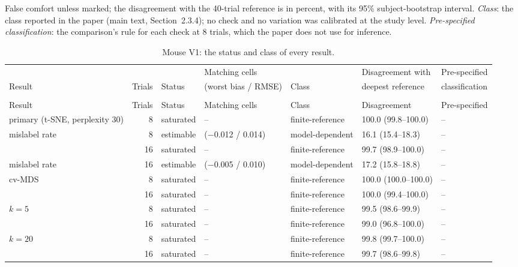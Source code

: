 \documentclass[11pt]{article}
\newcommand{\tablenote}[1]{\par\smallskip\noindent
  \begin{minipage}{\linewidth}\footnotesize\setlength{\parindent}{0pt}#1\end{minipage}}
\renewcommand{\thetable}{S\arabic{table}}
\begin{document}
\tablenote{False comfort unless marked; the disagreement with the 40-trial reference is in percent, with its 95\% subject-bootstrap interval.
\emph{Class}: the class reported in the paper (main text, Section~2.3.4); no check and no variation was calibrated at the study level.
\emph{Pre-specified classification}: the comparison's rule for each check at 8 trials, which the paper does not use for inference.}

{\scriptsize\setlength{\tabcolsep}{4pt}
\begin{longtable}{>{\raggedright\arraybackslash}p{3.0cm}rl>{\raggedright\arraybackslash}p{2.3cm}>{\raggedright\arraybackslash}p{2.1cm}ll}
\caption{Mouse V1: the status and class of every result.}\\
\toprule
 & & & Matching cells & & Disagreement with & Pre-specified \\
Result & Trials & Status & (worst bias / RMSE) & Class & deepest reference & classification \\
\midrule
\endfirsthead
\multicolumn{7}{l}{\textit{Table~\thetable, continued}} \\
\toprule
Result & Trials & Status & Matching cells & Class & Disagreement & Pre-specified \\
\midrule
\endhead
\bottomrule
\endfoot
primary (t-SNE, perplexity 30) & 8 & saturated & -- & finite-reference & 100.0 (99.8--100.0) & -- \\
\quad mislabel rate & 8 & estimable & 10 ($-$0.012 / 0.014) & model-dependent & 16.1 (15.4--18.3) & -- \\
 & 16 & saturated & -- & finite-reference & 99.7 (98.9--100.0) & -- \\
\quad mislabel rate & 16 & estimable & 9 ($-$0.005 / 0.010) & model-dependent & 17.2 (15.8--18.8) & -- \\
\addlinespace
cv-MDS & 8 & saturated & -- & finite-reference & 100.0 (100.0--100.0) & -- \\
 & 16 & saturated & -- & finite-reference & 100.0 (99.4--100.0) & -- \\
\addlinespace
$k=5$ & 8 & saturated & -- & finite-reference & 99.5 (98.6--99.9) & -- \\
 & 16 & saturated & -- & finite-reference & 99.0 (96.8--100.0) & -- \\
\addlinespace
$k=20$ & 8 & saturated & -- & finite-reference & 99.8 (99.7--100.0) & -- \\
 & 16 & saturated & -- & finite-reference & 99.7 (98.6--99.8) & -- \\

\end{longtable}}
\end{document}
